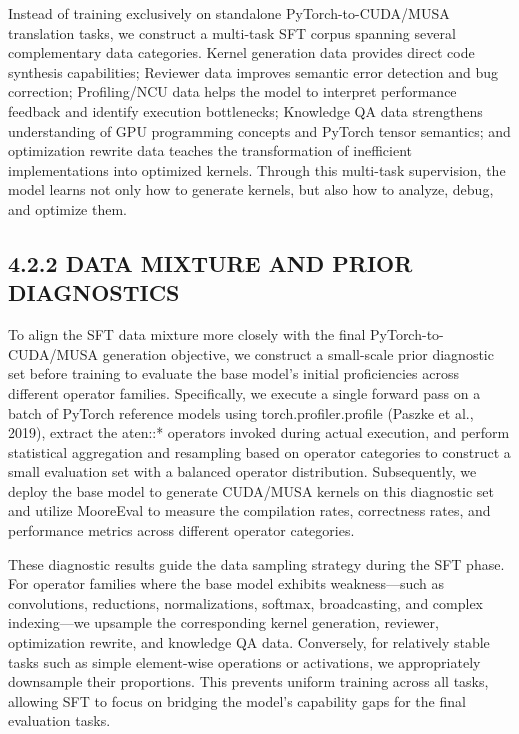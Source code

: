 \documentclass[
  10
]{article}
\begin{document}
Instead of training exclusively on standalone PyTorch-to-CUDA/MUSA
translation tasks, we construct a multi-task SFT corpus spanning several
complementary data categories. Kernel generation data provides direct
code synthesis capabilities; Reviewer data improves semantic error
detection and bug correction; Profiling/NCU data helps the model to
interpret performance feedback and identify execution bottlenecks;
Knowledge QA data strengthens understanding of GPU programming concepts
and PyTorch tensor semantics; and optimization rewrite data teaches the
transformation of inefficient implementations into optimized kernels.
Through this multi-task supervision, the model learns not only how to
generate kernels, but also how to analyze, debug, and optimize them.

\subsection{4.2.2 DATA MIXTURE AND PRIOR
DIAGNOSTICS}\label{data-mixture-and-prior-diagnostics}

To align the SFT data mixture more closely with the final
PyTorch-to-CUDA/MUSA generation objective, we construct a small-scale
prior diagnostic set before training to evaluate the base model's
initial proficiencies across different operator families. Specifically,
we execute a single forward pass on a batch of PyTorch reference models
using torch.profiler.profile (Paszke et al., 2019), extract the aten::*
operators invoked during actual execution, and perform statistical
aggregation and resampling based on operator categories to construct a
small evaluation set with a balanced operator distribution.
Subsequently, we deploy the base model to generate CUDA/MUSA kernels on
this diagnostic set and utilize MooreEval to measure the compilation
rates, correctness rates, and performance metrics across different
operator categories.

These diagnostic results guide the data sampling strategy during the SFT
phase. For operator families where the base model exhibits
weakness---such as convolutions, reductions, normalizations, softmax,
broadcasting, and complex indexing---we upsample the corresponding
kernel generation, reviewer, optimization rewrite, and knowledge QA
data. Conversely, for relatively stable tasks such as simple
element-wise operations or activations, we appropriately downsample
their proportions. This prevents uniform training across all tasks,
allowing SFT to focus on bridging the model's capability gaps for the
final evaluation tasks.
\end{document}
